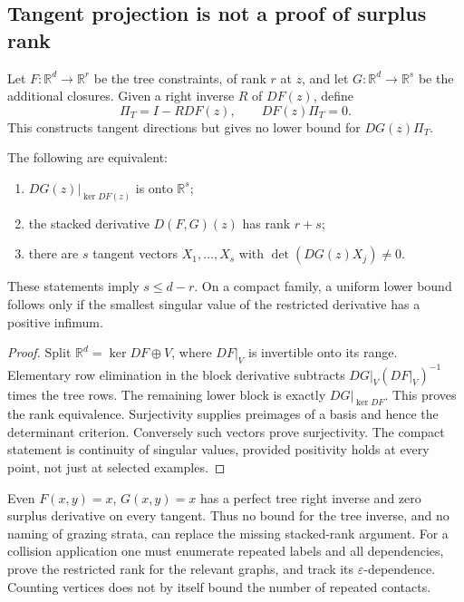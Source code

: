 \subsection{Tangent projection is not a proof of surplus rank}
Let $F:\mathbb R^d\to\mathbb R^r$ be the tree constraints, of rank $r$ at $z$, and let $G:\mathbb R^d\to\mathbb R^s$ be the additional closures. Given a right inverse $R$ of $DF(z)$, define
\[
 \Pi_T=I-RDF(z),\qquad DF(z)\Pi_T=0.
\]
This constructs tangent directions but gives no lower bound for $DG(z)\Pi_T$.

\begin{proposition}
\label{prop:r33-b2-rank}
The following are equivalent:
\begin{enumerate}
\item $DG(z)|_{\ker DF(z)}$ is onto $\mathbb R^s$;
\item the stacked derivative $D(F,G)(z)$ has rank $r+s$;
\item there are $s$ tangent vectors $X_1,\ldots,X_s$ with $\det(DG(z)X_j)\ne0$.
\end{enumerate}
These statements imply $s\le d-r$. On a compact family, a uniform lower bound follows only if the smallest singular value of the restricted derivative has a positive infimum.
\end{proposition}

\begin{proof}
Split $\mathbb R^d=\ker DF\oplus V$, where $DF|_V$ is invertible onto its range. Elementary row elimination in the block derivative subtracts $DG|_V(DF|_V)^{-1}$ times the tree rows. The remaining lower block is exactly $DG|_{\ker DF}$. This proves the rank equivalence. Surjectivity supplies preimages of a basis and hence the determinant criterion. Conversely such vectors prove surjectivity. The compact statement is continuity of singular values, provided positivity holds at every point, not just at selected examples.
\end{proof}

Even $F(x,y)=x$, $G(x,y)=x$ has a perfect tree right inverse and zero surplus derivative on every tangent. Thus no bound for the tree inverse, and no naming of grazing strata, can replace the missing stacked-rank argument. For a collision application one must enumerate repeated labels and all dependencies, prove the restricted rank for the relevant graphs, and track its $\varepsilon$-dependence. Counting vertices does not by itself bound the number of repeated contacts.

